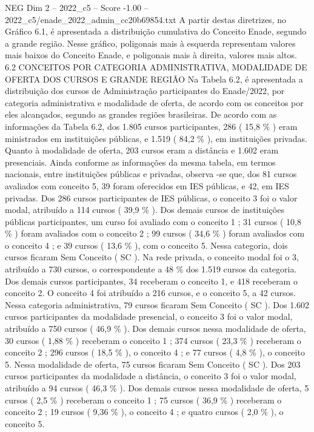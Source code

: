 \begin{textsample}{NEG Dim 2 – 2022\_c5 – Score -1.00 – 2022\_c5/enade\_2022\_admin\_cc20b69854.txt}
A partir destas diretrizes, no Gráfico 6.1, é apresentada a distribuição cumulativa do Conceito Enade, segundo a grande região.
Nesse gráfico, poligonais mais à esquerda representam valores mais baixos do Conceito Enade, e poligonais mais à direita, valores mais altos. 6.2 CONCEITOS POR CATEGORIA ADMINISTRATIVA, MODALIDADE DE OFERTA DOS CURSOS E GRANDE REGIÃO Na Tabela 6.2, é apresentada a distribuição dos cursos de Administração participantes do Enade/2022, por categoria administrativa e modalidade de oferta, de acordo com os conceitos por eles alcançados, segundo as grandes regiões brasileiras.
De acordo com as informações da Tabela 6.2, dos 1.805 cursos participantes, 286 ( 15,8 \% ) eram ministrados em instituições públicas, e 1.519 ( 84,2 \% ), em instituições privadas.
Quanto à modalidade de oferta, 203 cursos eram a distância e 1.602 eram presenciais.
Ainda conforme as informações da mesma tabela, em termos nacionais, entre instituições públicas e privadas, observa -se que, dos 81 cursos avaliados com conceito 5, 39 foram oferecidos em IES públicas, e 42, em IES privadas.
Dos 286 cursos participantes de IES públicas, o conceito 3 foi o valor modal, atribuído a 114 cursos ( 39,9 \% ).
Dos demais cursos de instituições públicas participantes, um curso foi avaliado com o conceito 1 ; 31 cursos ( 10,8 \% ) foram avaliados com o conceito 2 ; 99 cursos ( 34,6 \% ) foram avaliados com o conceito 4 ; e 39 cursos ( 13,6 \% ), com o conceito 5.
Nessa categoria, dois cursos ficaram Sem Conceito ( SC ).
Na rede privada, o conceito modal foi o 3, atribuído a 730 cursos, o correspondente a 48 \% dos 1.519 cursos da categoria.
Dos demais cursos participantes, 34 receberam o conceito 1, e 418 receberam o conceito 2.
O conceito 4 foi atribuído a 216 cursos, e o conceito 5, a 42 cursos.
Nessa categoria administrativa, 79 cursos ficaram Sem Conceito ( SC ).
Dos 1.602 cursos participantes da modalidade presencial, o conceito 3 foi o valor modal, atribuído a 750 cursos ( 46,9 \% ).
Dos demais cursos nessa modalidade de oferta, 30 cursos ( 1,88 \% ) receberam o conceito 1 ; 374 cursos ( 23,3 \% ) receberam o conceito 2 ; 296 cursos ( 18,5 \% ), o conceito 4 ; e 77 cursos ( 4,8 \% ), o conceito 5.
Nessa modalidade de oferta, 75 cursos ficaram Sem Conceito ( SC ).
Dos 203 cursos participantes da modalidade a distância, o conceito 3 foi o valor modal, atribuído a 94 cursos ( 46,3 \% ).
Dos demais cursos nessa modalidade de oferta, 5 cursos ( 2,5 \% ) receberam o conceito 1 ; 75 cursos ( 36,9 \% ) receberam o conceito 2 ; 19 cursos ( 9,36 \% ), o conceito 4 ; e quatro cursos ( 2,0 \% ), o conceito 5.

\end{textsample}
